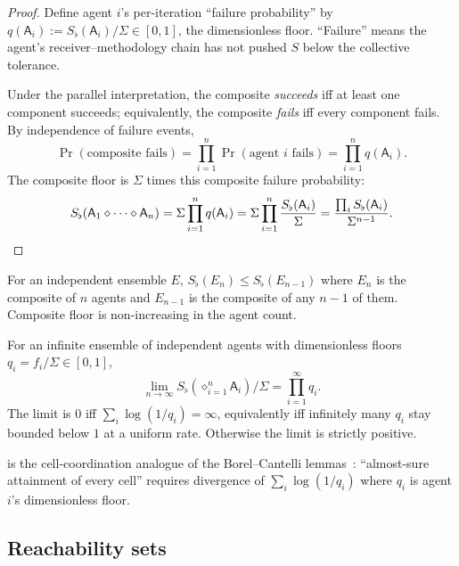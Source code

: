 \documentclass[11pt,twocolumn,a4paper]{article}
\newcommand{\agent}{\mathsf{A}}
\newcommand{\Sfloor}{S_{\flat}}
\newcommand{\Compose}{\diamond}
\begin{document}
\begin{proof}
Define agent $i$'s per-iteration ``failure probability'' by
$q(\agent_i):=\Sfloor(\agent_i)/\Sigma\in[0,1]$, the dimensionless
floor. ``Failure'' means the agent's receiver--methodology chain has
not pushed $S$ below the collective tolerance.

Under the parallel interpretation, the composite \emph{succeeds} iff
at least one component succeeds; equivalently, the composite
\emph{fails} iff every component fails. By independence of failure
events,
\[
\Pr(\text{composite fails})=\prod_{i=1}^n\Pr(\text{agent }i\text{ fails})
=\prod_{i=1}^n q(\agent_i).
\]
The composite floor is $\Sigma$ times this composite failure
probability:
\[
\Sfloor(\agent_1\Compose\cdots\Compose\agent_n)
=\Sigma\prod_{i=1}^n q(\agent_i)
=\Sigma\prod_{i=1}^n\frac{\Sfloor(\agent_i)}{\Sigma}
=\frac{\prod_i\Sfloor(\agent_i)}{\Sigma^{n-1}}. \qedhere
\]
\end{proof}

\begin{corollary}\label{cor:monotone}
For an independent ensemble $E$, $\Sfloor(E_n)\le\Sfloor(E_{n-1})$
where $E_n$ is the composite of $n$ agents and $E_{n-1}$ is the
composite of any $n-1$ of them. Composite floor is non-increasing in
the agent count.
\end{corollary}

\begin{corollary}\label{cor:asymptotic}
For an infinite ensemble of independent agents with dimensionless
floors $q_i=f_i/\Sigma\in[0,1]$,
\[
\lim_{n\to\infty}\Sfloor(\Compose_{i=1}^n\agent_i)/\Sigma
=\prod_{i=1}^\infty q_i.
\]
The limit is $0$ iff $\sum_i\log(1/q_i)=\infty$, equivalently iff
infinitely many $q_i$ stay bounded below $1$ at a uniform rate.
Otherwise the limit is strictly positive.
\end{corollary}

\begin{remark}\label{rem:bc-analogue}
 is the cell-coordination analogue of the
Borel--Cantelli lemmas~\cite{borel1909,cantelli1917}: ``almost-sure
attainment of every cell'' requires divergence of
$\sum_i\log(1/q_i)$ where $q_i$ is agent $i$'s dimensionless floor.
\end{remark}

\subsection{Reachability sets}
\end{document}
